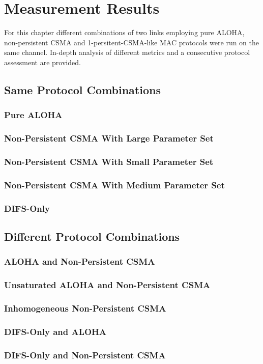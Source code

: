\chapter{Measurement Results}

For this chapter different combinations of two links employing pure ALOHA, non-persistent CSMA and 1-persitent-CSMA-like MAC protocols were run on the same channel. In-depth analysis of different metrics and a consecutive protocol assessment are provided. 

\section{Same Protocol Combinations}

\subsection{Pure ALOHA}

\subsection{Non-Persistent CSMA With Large Parameter Set}

\subsection{Non-Persistent CSMA With Small Parameter Set}

\subsection{Non-Persistent CSMA With Medium Parameter Set}

\subsection{DIFS-Only}

\section{Different Protocol Combinations}

\subsection{ALOHA and Non-Persistent CSMA}



\subsection{Unsaturated ALOHA and Non-Persistent CSMA}

\subsection{Inhomogeneous Non-Persistent CSMA }

\subsection{DIFS-Only and ALOHA}

\subsection{DIFS-Only and Non-Persistent CSMA}